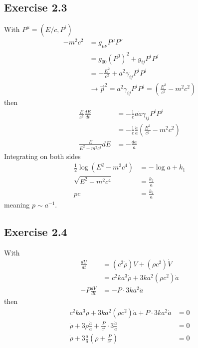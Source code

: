 \documentclass[10pt,a4paper]{book}
\theoremstyle{definition}
\begin{document}
\subsection{Exercise 2.3}
With $P^\mu=(E/c,P^i)$
\begin{align}
-m^2c^2
&=g_{\mu\nu}P^\mu P^\nu\\
&=g_{00}(P^0)^2+g_{ij}P^iP^j\\
&=-\frac{E^2}{c^2}+a^2\gamma_{ij}P^iP^j\\
&\rightarrow \vec{p}^2=a^2\gamma_{ij}P^iP^j=\left(\frac{E^2}{c^2}-m^2c^2\right)
\end{align}
then
\begin{align}
\frac{E}{c^3}\frac{dE}{dt}
&=-\frac{1}{c}a\dot{a}\gamma_{ij}P^iP^j\\
&=-\frac{1}{c}\frac{\dot{a}}{a}\left(\frac{E^2}{c^2}-m^2c^2\right)\\
\frac{E}{E^2-m^2c^4}dE&=-\frac{da}{a}
\end{align}
Integrating on both sides
\begin{align}
\frac{1}{2}\log(E^2-m^2c^4)&=-\log a+k_1\\
\sqrt{E^2-m^2c^4}&=\frac{k_2}{a}\\
pc&=\frac{k_2}{a}
\end{align}
meaning $p\sim a^{-1}$.


\subsection{Exercise 2.4}
With
\begin{align}
\frac{dU}{dt}
&=(c^2\dot\rho)V+(\rho c^2)\dot V\\
&=c^2ka^3\dot\rho+3ka^2(\rho c^2)\dot a\\
-P\frac{dV}{dt}
&=-P\cdot3ka^2\dot a
\end{align}
then
\begin{align}
c^2ka^3\dot\rho+3ka^2(\rho c^2)\dot a+P\cdot3ka^2\dot a&=0\\
\dot\rho+3\rho\frac{\dot a}{a}+\frac{P}{c^2}\cdot3\frac{\dot a}{a}&=0\\
\dot\rho+3\frac{\dot a}{a}\left(\rho+\frac{P}{c^2}\right)&=0
\end{align}
\end{document}
